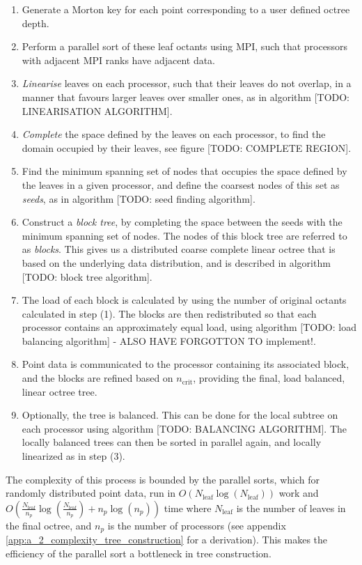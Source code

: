 \begin{enumerate}
    \item Generate a Morton key for each point corresponding to a user defined octree depth.
    \item Perform a parallel sort of these leaf octants using MPI, such that processors with adjacent MPI ranks have adjacent data.
    \item \textit{Linearise} leaves on each processor, such that their leaves do not overlap, in a manner that favours larger leaves over smaller ones, as in algorithm [TODO: LINEARISATION ALGORITHM].
    \item \textit{Complete} the space defined by the leaves on each processor, to find the domain occupied by their leaves, see figure [TODO: COMPLETE REGION].
    \item Find the minimum spanning set of nodes that occupies the space defined by the leaves in a given processor, and define the coarsest nodes of this set as \textit{seeds}, as in algorithm [TODO: seed finding algorithm].
    \item Construct a \textit{block tree}, by completing the space between the seeds with the minimum spanning set of nodes. The nodes of this block tree are referred to as \textit{blocks}. This gives us a distributed coarse complete linear octree that is based on the underlying data distribution, and is described in algorithm [TODO: block tree algorithm].
    \item The load of each block is calculated by using the number of original octants calculated in step (1). The blocks are then redistributed so that each processor contains an approximately equal load, using algorithm [TODO: load balancing algorithm] - ALSO HAVE FORGOTTON TO implement!.
    \item Point data is communicated to the processor containing its associated block, and the blocks are refined based on $n_{\text{crit}}$, providing the final, load balanced, linear octree tree.
    \item Optionally, the tree is balanced. This can be done for the local subtree on each processor using algorithm [TODO: BALANCING ALGORITHM]. The locally balanced trees can then be sorted in parallel again, and locally linearized as in step (3).
\end{enumerate}

The complexity of this process is bounded by the parallel sorts, which for randomly distributed point data, run in $O(N_{\text{leaf}} \log (N_{\text{leaf}}))$ work and $O(\frac{N_{\text{leaf}}}{n_p} \log(\frac{N_{\text{leaf}}}{n_p}) + n_p \log (n_p))$ time where $N_{\text{leaf}}$ is the number of leaves in the final octree, and $n_p$ is the number of processors (see appendix \ref{app:a_2_complexity_tree_construction} for a derivation). This makes the efficiency of the parallel sort a bottleneck in tree construction.

